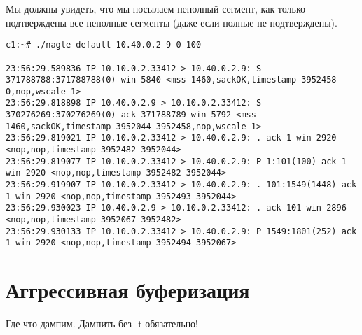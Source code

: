\documentclass[a4paper,12pt]{article}
\begin{document}
Мы должны увидеть, что мы посылаем неполный сегмент, как только
подтверждены все неполные сегменты (даже если полные не подтверждены).

\begin{lstlisting}
c1:~# ./nagle default 10.40.0.2 9 0 100

23:56:29.589836 IP 10.10.0.2.33412 > 10.40.0.2.9: S 371788788:371788788(0) win 5840 <mss 1460,sackOK,timestamp 3952458 0,nop,wscale 1>
23:56:29.818898 IP 10.40.0.2.9 > 10.10.0.2.33412: S 370276269:370276269(0) ack 371788789 win 5792 <mss 1460,sackOK,timestamp 3952044 3952458,nop,wscale 1>
23:56:29.819021 IP 10.10.0.2.33412 > 10.40.0.2.9: . ack 1 win 2920 <nop,nop,timestamp 3952482 3952044>
23:56:29.819077 IP 10.10.0.2.33412 > 10.40.0.2.9: P 1:101(100) ack 1 win 2920 <nop,nop,timestamp 3952482 3952044>
23:56:29.919907 IP 10.10.0.2.33412 > 10.40.0.2.9: . 101:1549(1448) ack 1 win 2920 <nop,nop,timestamp 3952493 3952044>
23:56:29.930023 IP 10.40.0.2.9 > 10.10.0.2.33412: . ack 101 win 2896 <nop,nop,timestamp 3952067 3952482>
23:56:29.930133 IP 10.10.0.2.33412 > 10.40.0.2.9: P 1549:1801(252) ack 1 win 2920 <nop,nop,timestamp 3952494 3952067>
\end{lstlisting}

\section{Аггрессивная буферизация}

Где что дампим.  Дампить без -t обязательно!
\end{document}
